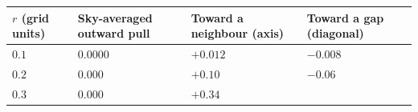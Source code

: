 \documentclass[
]{article}
\begin{document}
\begin{longtable}[]{@{}llll@{}}
\toprule
\begin{minipage}[b]{0.22\columnwidth}\raggedright
\(r\) (grid units)\strut
\end{minipage} & \begin{minipage}[b]{0.22\columnwidth}\raggedright
Sky-averaged outward pull\strut
\end{minipage} & \begin{minipage}[b]{0.22\columnwidth}\raggedright
Toward a neighbour (axis)\strut
\end{minipage} & \begin{minipage}[b]{0.22\columnwidth}\raggedright
Toward a gap (diagonal)\strut
\end{minipage}\tabularnewline
\midrule
\endhead
\begin{minipage}[t]{0.22\columnwidth}\raggedright
\(0.1\)\strut
\end{minipage} & \begin{minipage}[t]{0.22\columnwidth}\raggedright
\(0.0000\)\strut
\end{minipage} & \begin{minipage}[t]{0.22\columnwidth}\raggedright
\(+0.012\)\strut
\end{minipage} & \begin{minipage}[t]{0.22\columnwidth}\raggedright
\(-0.008\)\strut
\end{minipage}\tabularnewline
\begin{minipage}[t]{0.22\columnwidth}\raggedright
\(0.2\)\strut
\end{minipage} & \begin{minipage}[t]{0.22\columnwidth}\raggedright
\(0.000\)\strut
\end{minipage} & \begin{minipage}[t]{0.22\columnwidth}\raggedright
\(+0.10\)\strut
\end{minipage} & \begin{minipage}[t]{0.22\columnwidth}\raggedright
\(-0.06\)\strut
\end{minipage}\tabularnewline
\begin{minipage}[t]{0.22\columnwidth}\raggedright
\(0.3\)\strut
\end{minipage} & \begin{minipage}[t]{0.22\columnwidth}\raggedright
\(0.000\)\strut
\end{minipage} & \begin{minipage}[t]{0.22\columnwidth}\raggedright
\(+0.34\)\strut
\end{minipage} & \begin{minipage}[t]{0.22\columnwidth}\raggedright

\end{minipage}
\end{longtable}
\end{document}
